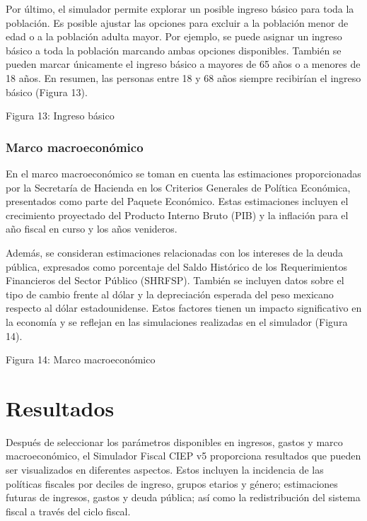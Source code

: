 Por último, el simulador permite explorar un posible ingreso básico para
toda la población. Es posible ajustar las opciones para excluir a la
población menor de edad o a la población adulta mayor. Por ejemplo, se
puede asignar un ingreso básico a toda la población marcando ambas
opciones disponibles. También se pueden marcar únicamente el ingreso
básico a mayores de 65 años o a menores de 18 años. En resumen, las
personas entre 18 y 68 años siempre recibirían el ingreso básico (Figura
13).

Figura 13: Ingreso básico


\hypertarget{marco-macroeconuxf3mico}{%
\subsubsection{Marco macroeconómico}\label{marco-macroeconuxf3mico}}

En el marco macroeconómico se toman en cuenta las estimaciones
proporcionadas por la Secretaría de Hacienda en los Criterios Generales
de Política Económica, presentados como parte del Paquete Económico.
Estas estimaciones incluyen el crecimiento proyectado del Producto
Interno Bruto (PIB) y la inflación para el año fiscal en curso y los
años venideros.

Además, se consideran estimaciones relacionadas con los intereses de la
deuda pública, expresados como porcentaje del Saldo Histórico de los
Requerimientos Financieros del Sector Público (SHRFSP). También se
incluyen datos sobre el tipo de cambio frente al dólar y la depreciación
esperada del peso mexicano respecto al dólar estadounidense. Estos
factores tienen un impacto significativo en la economía y se reflejan en
las simulaciones realizadas en el simulador (Figura 14).

Figura 14: Marco macroeconómico


\hypertarget{resultados}{%
\section{Resultados}\label{resultados}}

Después de seleccionar los parámetros disponibles en ingresos, gastos y
marco macroeconómico, el Simulador Fiscal CIEP v5 proporciona resultados
que pueden ser visualizados en diferentes aspectos. Estos incluyen la
incidencia de las políticas fiscales por deciles de ingreso, grupos
etarios y género; estimaciones futuras de ingresos, gastos y deuda
pública; así como la redistribución del sistema fiscal a través del
ciclo fiscal.

